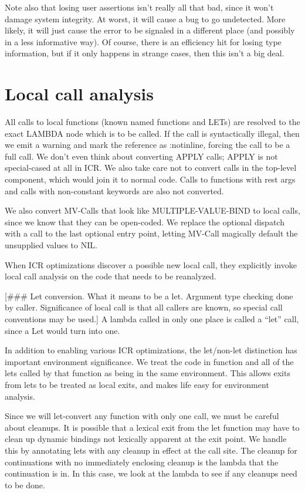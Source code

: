 Note also that losing user assertions isn't really all that bad, since it won't
damage system integrity.  At worst, it will cause a bug to go undetected.  More
likely, it will just cause the error to be signaled in a different place (and
possibly in a less informative way).  Of course, there is an efficiency hit for
losing type information, but if it only happens in strange cases, then this
isn't a big deal.

\chapter{Local call analysis}

All calls to local functions (known named functions and LETs) are resolved to
the exact LAMBDA node which is to be called.  If the call is syntactically
illegal, then we emit a warning and mark the reference as :notinline, forcing
the call to be a full call.  We don't even think about converting APPLY calls;
APPLY is not special-cased at all in ICR.  We also take care not to convert
calls in the top-level component, which would join it to normal code.  Calls to
functions with rest args and calls with non-constant keywords are also not
converted.

We also convert MV-Calls that look like MULTIPLE-VALUE-BIND to local calls,
since we know that they can be open-coded.  We replace the optional dispatch
with a call to the last optional entry point, letting MV-Call magically default
the unsupplied values to NIL.

When ICR optimizations discover a possible new local call, they explicitly
invoke local call analysis on the code that needs to be reanalyzed. 

[\#\#\# Let conversion.  What it means to be a let.  Argument type checking done
by caller.  Significance of local call is that all callers are known, so
special call conventions may be used.]
A lambda called in only one place is called a ``let'' call, since a Let would
turn into one.

In addition to enabling various ICR optimizations, the let/non-let distinction
has important environment significance.  We treat the code in function and all
of the lets called by that function as being in the same environment.  This
allows exits from lets to be treated as local exits, and makes life easy for
environment analysis.  

Since we will let-convert any function with only one call, we must be careful
about cleanups.  It is possible that a lexical exit from the let function may
have to clean up dynamic bindings not lexically apparent at the exit point.  We
handle this by annotating lets with any cleanup in effect at the call site.
The cleanup for continuations with no immediately enclosing cleanup is the
lambda that the continuation is in.  In this case, we look at the lambda to see
if any cleanups need to be done.

